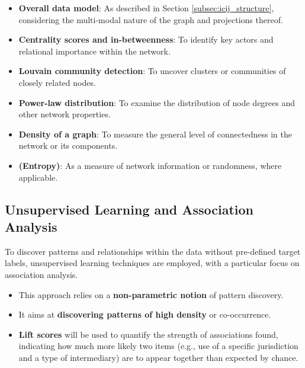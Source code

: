 \begin{enumerate}
\begin{itemize}
    \item \textbf{Overall data model}: As described in Section \ref{subsec:icij_structure}, considering the multi-modal nature of the graph and projections thereof.
    \item \textbf{Centrality scores and in-betweenness}: To identify key actors and relational importance within the network.
    \item \textbf{Louvain community detection}: To uncover clusters or communities of closely related nodes.
    \item \textbf{Power-law distribution}: To examine the distribution of node degrees and other network properties.
    \item \textbf{Density of a graph}: To measure the general level of connectedness in the network or its components.
    \item \textbf{(Entropy)}: As a measure of network information or randomness, where applicable.
\end{itemize}

\subsection{Unsupervised Learning and Association Analysis}
\label{subsec:unsupervised_learning}

To discover patterns and relationships within the data without pre-defined target labels, unsupervised learning techniques are employed, with a particular focus on association analysis.

\begin{itemize}
    \item This approach relies on a \textbf{non-parametric notion} of pattern discovery.
    \item It aims at \textbf{discovering patterns of high density} or co-occurrence.
    \item \textbf{Lift scores} will be used to quantify the strength of associations found, indicating how much more likely two items (e.g., use of a specific jurisdiction and a type of intermediary) are to appear together than expected by chance.
\end{itemize}


\end{enumerate}
